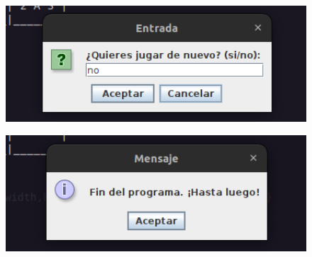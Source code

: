 \documentclass{article}
\begin{document}
	\begin{figure}[H]
		\centering
		\includegraphics[width=1.0\textwidth,keepaspectratio]{img/Commit12-3.png}
	\end{figure}
	\begin{figure}[H]
		\centering
		\includegraphics[width=1.0\textwidth,keepaspectratio]{img/Commit12-4.png}
	\end{figure}
\end{document}
